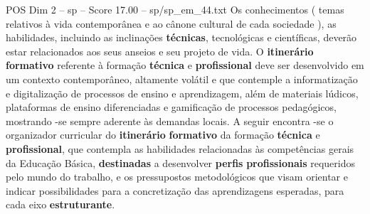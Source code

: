 \begin{textsample}{POS Dim 2 – sp – Score 17.00 – sp/sp\_em\_44.txt}
Os conhecimentos ( temas relativos à vida contemporânea e ao cânone cultural de cada sociedade ), as habilidades, incluindo as inclinações \textbf{técnicas}, tecnológicas e científicas, deverão estar relacionados aos seus anseios e seu projeto de vida.
O \textbf{itinerário} \textbf{formativo} referente à formação \textbf{técnica} e \textbf{profissional} deve ser desenvolvido em um contexto contemporâneo, altamente volátil e que contemple a informatização e digitalização de processos de ensino e aprendizagem, além de materiais lúdicos, plataformas de ensino diferenciadas e gamificação de processos pedagógicos, mostrando -se sempre aderente às demandas locais.
A seguir encontra -se o organizador curricular do \textbf{itinerário} \textbf{formativo} da formação \textbf{técnica} e \textbf{profissional}, que contempla as habilidades relacionadas às competências gerais da Educação Básica, \textbf{destinadas} a desenvolver \textbf{perfis} \textbf{profissionais} requeridos pelo mundo do trabalho, e os pressupostos metodológicos que visam orientar e indicar possibilidades para a concretização das aprendizagens esperadas, para cada eixo \textbf{estruturante}.

\end{textsample}
